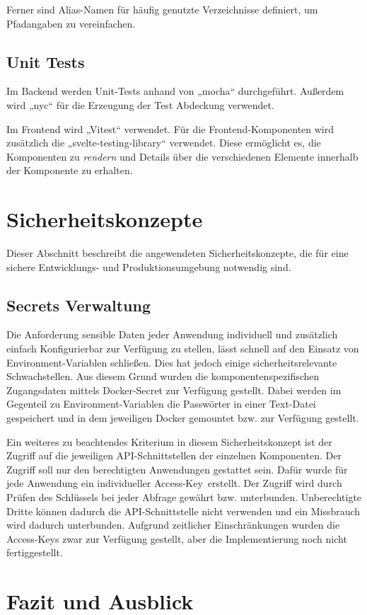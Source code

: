 \documentclass[a4paper, 10pt, conference]{IEEEtran}
\begin{document}
Ferner sind Alias-Namen für häufig genutzte Verzeichnisse definiert, um Pfadangaben zu vereinfachen.

\subsection{Unit Tests}

Im Backend werden Unit-Tests anhand von „mocha“ \cite{mochajs} durchgeführt. Außerdem wird „nyc“ \cite{instanbuljs} für die Erzeugung der Test Abdeckung verwendet.

Im Frontend wird „Vitest“ \cite{vitest} verwendet. Für die Frontend-Komponenten wird zusätzlich die „svelte-testing-library“ \cite{stl} verwendet. Diese ermöglicht es, die Komponenten zu \textit{rendern} und Details über die verschiedenen Elemente innerhalb der Komponente zu erhalten.

\section{Sicherheitskonzepte} \label{s:sicherheitskonzepte}

Dieser Abschnitt beschreibt die angewendeten Sicherheitskonzepte, die für eine sichere Entwicklungs- und Produktionsumgebung notwendig sind.

\subsection{Secrets Verwaltung} \label{s:secrets}
Die Anforderung sensible Daten jeder Anwendung individuell und zusätzlich einfach Konfigurierbar zur Verfügung zu stellen, lässt schnell auf den Einsatz von Environment-Variablen schließen. Dies hat jedoch einige sicherheitsrelevante Schwachstellen.
Aus diesem Grund wurden die komponentenspezifischen Zugangsdaten mittels Docker-Secret zur Verfügung gestellt. Dabei werden im Gegenteil zu Environment-Variablen die Passwörter in einer Text-Datei gespeichert und in dem jeweiligen Docker gemountet bzw. zur Verfügung gestellt.

Ein weiteres zu beachtendes Kriterium in diesem Sicherheitskonzept ist der Zugriff auf die jeweiligen API-Schnittstellen der einzelnen Komponenten. Der Zugriff soll nur den berechtigten Anwendungen gestattet sein. Dafür wurde für jede Anwendung ein individueller  \glqq Access-Key\grqq \ erstellt. Der Zugriff wird durch Prüfen des Schlüssels bei jeder Abfrage gewährt bzw. unterbunden. Unberechtigte Dritte können dadurch die API-Schnittstelle nicht verwenden und ein Missbrauch wird dadurch unterbunden.
Aufgrund zeitlicher Einschränkungen wurden die Access-Keys zwar zur Verfügung gestellt, aber die Implementierung noch nicht fertiggestellt.


\section{Fazit und Ausblick} \label{s:fazit}


\printbibliography
\end{document}
